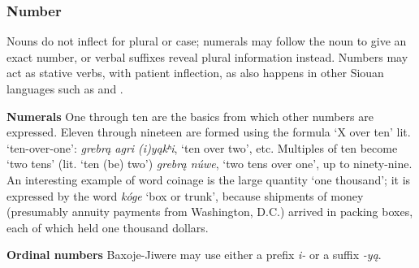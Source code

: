 \documentclass[output=paper]{LSP/langsci}
\begin{document}
\subsubsection{Number}  Nouns do not inflect for plural or case; numerals may follow the noun to give an exact number, or verbal suffixes reveal plural information instead.  Numbers may act as stative verbs, with  patient inflection, as also happens in other Siouan languages such as  \citep[481]{Rankin2005b} and  \citep[708]{Ullrich2008}.  

\vspace{1em}
\textbf{Numerals}  One through ten are the basics from which other numbers are expressed. Eleven through nineteen are formed using the formula `X over ten' {lit. `ten-over-one'}: \textit{grebr\k{a} agri (i)y\k{a}kʰi}, `ten over two', etc. Multiples of ten become `two tens' (lit. `ten (be) two') \textit{grebr\k{a} núwe}, `two tens over one',  up to ninety-nine.  An interesting example of word coinage is the large quantity `one thousand'; it is expressed by the word \textit{kóge} `box or trunk', because shipments of money (presumably annuity payments from Washington, D.C.) arrived in packing boxes, each of which held one thousand dollars.
											
\vspace{1em}
\textbf{Ordinal numbers}  Baxoje-Jiwere may use either a prefix \textit{i-} or a suffix \textit{-y\k{a}}.
\end{document}

